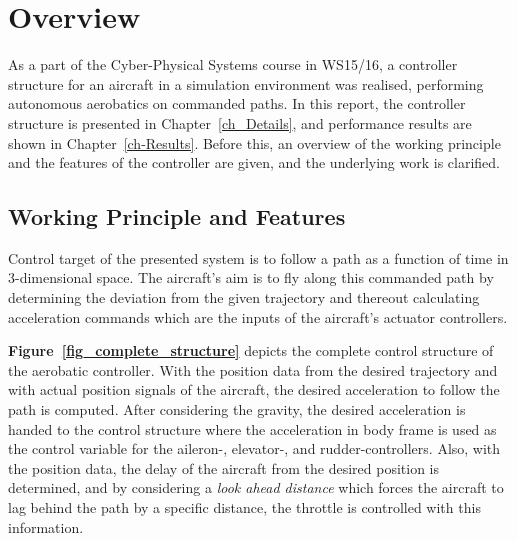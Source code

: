 \documentclass[11pt,a4paper]{scrartcl}		%
\begin{document}


\newpage
	

\section{Overview}

As a part of the Cyber-Physical Systems course in WS15/16, a controller structure for an aircraft in a simulation environment was realised, performing autonomous aerobatics on commanded paths.
In this report, the controller structure is presented in Chapter~\ref{ch_Details}, and performance results are shown in Chapter~\ref{ch-Results}.
Before this, an overview of the working principle and the features of the controller are given, and the underlying work is clarified.

\medskip






\subsection{Working Principle and Features}

Control target of the presented system is to follow a path as a function of time in 3-dimensional space.
The aircraft's aim is to fly along this commanded path by determining the deviation from the given trajectory and thereout calculating acceleration commands which are the inputs of the aircraft's actuator controllers.

\textbf{Figure~\ref{fig_complete_structure}} depicts the complete control structure of the aerobatic controller. 
With the position data from the desired trajectory and with actual position signals of the aircraft, the desired acceleration to follow the path is computed.
After considering the gravity, the desired acceleration is handed to the control structure where the acceleration in body frame is used as the control variable for the aileron-, elevator-, and rudder-controllers.
Also, with the position data, the delay of the aircraft from the desired position is determined, and by considering a \textsl{look ahead distance} which forces the aircraft to lag behind the path by a specific distance, the throttle is controlled with this information.
\end{document}
